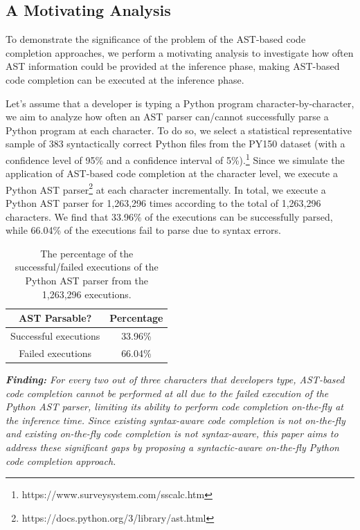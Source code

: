 \subsection{A Motivating Analysis}
\label{sec:motivation}

To demonstrate the significance of the problem of the AST-based code completion approaches, we perform a motivating analysis to investigate how often AST information could be provided at the inference phase, making AST-based code completion can be executed at the inference phase.

Let's assume that a developer is typing a Python program character-by-character, we aim to analyze how often an AST parser can/cannot successfully parse a Python program at each character.
To do so, we select a statistical representative sample of 383 syntactically correct Python files from the PY150 dataset (with a confidence level of 95\% and a confidence interval of 5\%).\footnote{https://www.surveysystem.com/sscalc.htm}
Since we simulate the application of AST-based code completion at the character level, we execute a Python AST parser\footnote{https://docs.python.org/3/library/ast.html} at each character incrementally.
In total, we execute a Python AST parser for 1,263,296 times according to the total of 1,263,296 characters.
We find that 33.96\% of the executions can be successfully parsed, while 66.04\% of the executions fail to parse due to syntax errors.



\begin{table}[h]
    \centering
    \begin{tabular}{c|c}
        AST Parsable? & Percentage \\
        \hline
        Successful executions & 33.96\% \\
        Failed executions & 66.04\%
    \end{tabular}
    \caption{The percentage of the successful/failed executions of the Python AST parser from the 1,263,296 executions.}
    \label{tab:simulation}
\end{table}

\begin{tcolorbox}
\emph{\textbf{Finding:} For every two out of three characters that developers type, AST-based code completion cannot be performed at all due to the failed execution of the Python AST parser, limiting its ability to perform code completion on-the-fly at the inference time.
Since existing syntax-aware code completion is not on-the-fly and existing on-the-fly code completion is not syntax-aware, this paper aims to address these significant gaps by proposing a syntactic-aware on-the-fly Python code completion approach.
}
\end{tcolorbox}


